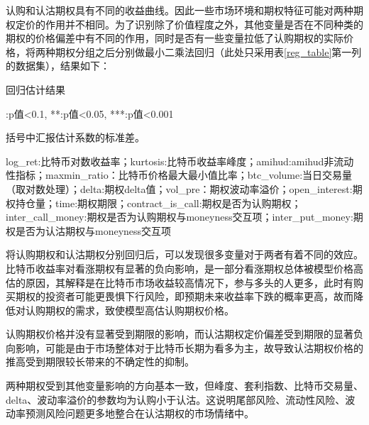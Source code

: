 \par{认购和认沽期权具有不同的收益曲线。因此一些市场环境和期权特征可能对两种期权定价的作用并不相同。为了识别除了价值程度之外，其他变量是否在不同种类的期权的价格偏差中有不同的作用，同时是否有一些变量拉低了认购期权的实际价格，将两种期权分组之后分别做最小二乘法回归（此处只采用表\ref{reg_table}第一列的数据集），结果如下：}
\newpage
{}
\begin{center}
\begin{threeparttable}[H]

\caption{回归估计结果}
\label{call_put_reg}

\begin{tablenotes}
\footnotesize
\item *:p值<0.1, **:p值<0.05, ***:p值<0.001
\item 括号中汇报估计系数的标准差。
\item log\_ret:比特币对数收益率；kurtosis:比特币收益率峰度；amihud:amihud非流动性指标；maxmin\_ratio：比特币价格最大最小值比率；btc\_volume:当日交易量（取对数处理）；delta:期权delta值；vol\_pre：期权波动率溢价；open\_interest:期权持仓量；time:期权期限；contract\_is\_call:期权是否为认购期权；inter\_call\_money:期权是否为认购期权与moneyness交互项；inter\_put\_money:期权是否为认沽期权与moneyness交互项
\end{tablenotes}
\end{threeparttable}
\end{center}
\newpage
\restoregeometry
将认购期权和认沽期权分别回归后，可以发现很多变量对于两者有着不同的效应。比特币收益率对看涨期权有显著的负向影响，是一部分看涨期权总体被模型价格高估的原因，其解释是在比特币市场收益较高情况下，参与多头的人更多，此时有购买期权的投资者可能更畏惧下行风险，即预期未来收益率下跌的概率更高，故而降低对认购期权的需求，致使模型高估认购期权价格。
\par{认购期权价格并没有显著受到期限的影响，而认沽期权定价偏差受到期限的显著负向影响，可能是由于市场整体对于比特币长期为看多为主，故导致认沽期权价格的推高受到期限较长带来的不确定性的抑制。}
\par{两种期权受到其他变量影响的方向基本一致，但峰度、套利指数、比特币交易量、delta、波动率溢价的参数均为认购小于认沽。这说明尾部风险、流动性风险、波动率预测风险问题更多地整合在认沽期权的市场情绪中。}